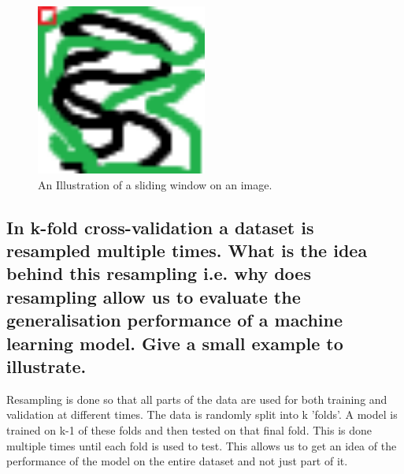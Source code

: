 \begin{figure}[H]
    \centering
    \includegraphics[width=0.5\textwidth]{images/Untitled.png}
    \caption{An Illustration of a sliding window on an image.}
    \end{figure}
\par

\subsection{In k-fold cross-validation a dataset is resampled multiple times. What is the
idea behind this resampling i.e. why does resampling allow us to evaluate the
generalisation performance of a machine learning model. Give a small example
to illustrate.}
Resampling is done so that all parts of the data are used for both training and validation at different times.
The data is randomly split into k 'folds'. 
A model is trained on k-1 of these folds and then tested on that final fold.
This is done multiple times until each fold is used to test.
This allows us to get an idea of the performance of the model on the entire dataset and not just part of it.


